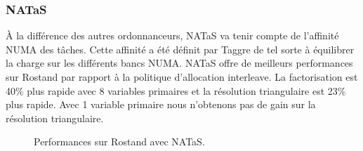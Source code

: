 \subsubsection{NATaS}
\`A la différence des autres ordonnanceurs, NATaS va tenir compte de l'affinité NUMA des tâches.
%
Cette affinité a été définit par Taggre de tel sorte à équilibrer la charge sur les différents bancs NUMA.
%
NATaS offre de meilleurs performances sur Rostand par rapport à la politique d'allocation interleave.
%
La factorisation est 40\% plus rapide avec 8 variables primaires et la résolution triangulaire est 23\% plus rapide.
%
Avec 1 variable primaire nous n'obtenons pas de gain sur la résolution triangulaire.


\begin{figure}[!ht]
     \begin{center}
    \end{center}
    \caption{Performances sur Rostand avec NATaS.}
\end{figure}

